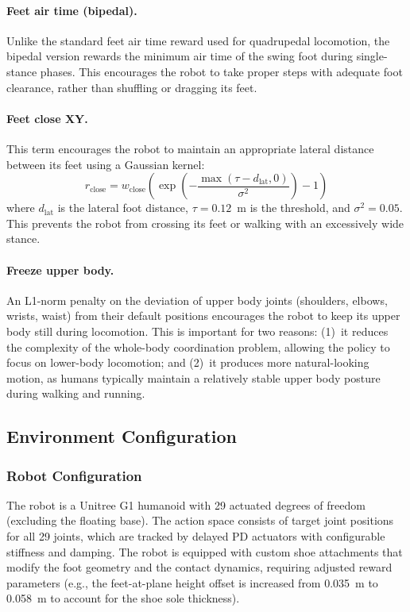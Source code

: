 \paragraph{Feet air time (bipedal).}
Unlike the standard feet air time reward used for quadrupedal locomotion, the bipedal version rewards the minimum air time of the swing foot during single-stance phases. This encourages the robot to take proper steps with adequate foot clearance, rather than shuffling or dragging its feet.

\paragraph{Feet close XY.}
This term encourages the robot to maintain an appropriate lateral distance between its feet using a Gaussian kernel:
\begin{equation}
    r_{\text{close}} = w_{\text{close}} \left(\exp\left(-\frac{\max(\tau - d_{\text{lat}}, 0)}{\sigma^2}\right) - 1\right)
\end{equation}
where $d_{\text{lat}}$ is the lateral foot distance, $\tau = 0.12$~m is the threshold, and $\sigma^2 = 0.05$. This prevents the robot from crossing its feet or walking with an excessively wide stance.

\paragraph{Freeze upper body.}
An L1-norm penalty on the deviation of upper body joints (shoulders, elbows, wrists, waist) from their default positions encourages the robot to keep its upper body still during locomotion. This is important for two reasons: (1)~it reduces the complexity of the whole-body coordination problem, allowing the policy to focus on lower-body locomotion; and (2)~it produces more natural-looking motion, as humans typically maintain a relatively stable upper body posture during walking and running.

\subsection{Environment Configuration}
\label{sec:env_config}

\subsubsection{Robot Configuration}

The robot is a Unitree G1 humanoid with 29 actuated degrees of freedom (excluding the floating base). The action space consists of target joint positions for all 29 joints, which are tracked by delayed PD actuators with configurable stiffness and damping. The robot is equipped with custom shoe attachments that modify the foot geometry and the contact dynamics, requiring adjusted reward parameters (e.g., the feet-at-plane height offset is increased from 0.035~m to 0.058~m to account for the shoe sole thickness).

